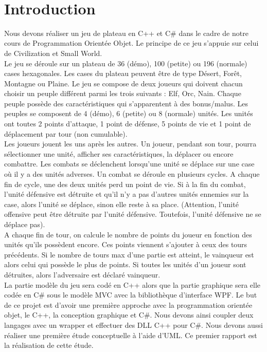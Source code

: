 \documentclass[a4paper,11pt]{article}
\begin{document}
\thispagestyle{empty}      %


\newpage
\mbox{}\\
\newpage
\thispagestyle{empty}

\tableofcontents
\newpage
\setcounter{page}{1}
\section{Introduction}
Nous devons réaliser un jeu de plateau en C++ et C\# dans le cadre de notre cours de Programmation Orientée Objet. Le principe de ce jeu s'appuie sur celui de Civilization et Small World.\medskip\\
Le jeu se déroule sur un plateau de 36 (démo), 100 (petite) ou 196 (normale) cases hexagonales. Les cases du plateau peuvent être de type Désert, Forêt, Montagne ou Plaine. Le jeu se compose de deux joueurs qui doivent chacun choisir un peuple différent parmi les trois suivants : Elf, Orc, Nain. Chaque peuple possède des caractéristiques qui s'apparentent à des bonus/malus. Les peuples se composent de 4 (démo), 6 (petite) ou 8 (normale) unités. Les unités ont toutes 2 points d'attaque, 1 point de défense, 5 points de vie et 1 point de déplacement par tour (non cumulable).\medskip\\
Les joueurs jouent les uns après les autres. Un joueur, pendant son tour, pourra sélectionner une unité, afficher ses caractéristiques, la déplacer ou encore combattre. Les combats se déclenchent lorsqu'une unité se déplace sur une case où il y a des unités adverses. Un combat se déroule en plusieurs cycles. A chaque fin de cycle, une des deux unités perd un point de vie. Si à la fin du combat, l'unité défensive est détruite et qu'il n'y a pas d'autres unités ennemies sur la case, alors l'unité se déplace, sinon elle reste à sa place. (Attention, l'unité offensive peut être détruite par l'unité défensive. Toutefois, l'unité défensive ne se déplace pas).\medskip\\
A chaque fin de tour, on calcule le nombre de points du joueur en fonction des unités qu'ils possèdent encore. Ces points viennent s'ajouter à ceux des tours précédents. Si le nombre de tours max d'une partie est atteint, le vainqueur est alors celui qui possède le plus de points. Si toutes les unités d'un joueur sont détruites, alors l'adversaire est déclaré vainqueur.\medskip\\
La partie modèle du jeu sera codé en C++ alors que la partie graphique sera elle codée en C\# sous le modèle MVC avec la bibliothèque d'interface WPF. Le but de ce projet est d'avoir une première approche avec la programmation orientée objet, le C++, la conception graphique et C\#. Nous devons ainsi coupler deux langages avec un wrapper et effectuer des DLL C++ pour C\#.  Nous devons aussi réaliser une première étude conceptuelle à l'aide d'UML. Ce premier rapport est la réalisation de cette étude.
\newpage
\end{document}
